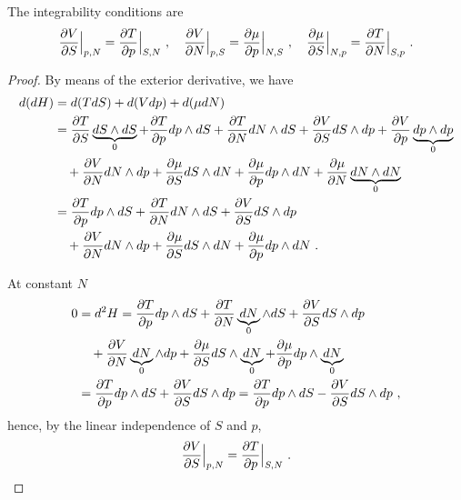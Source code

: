    The integrability conditions are 
    \begin{equation}\label{td:int:h}
        \frac{\partial V}{\partial S} \Big \vert_{p,N} = \frac{\partial T}{\partial p} \Big \vert_{S,N} ~, \quad 
        \frac{\partial V}{\partial N} \Big \vert_{p,S} = \frac{\partial\mu}{\partial p} \Big \vert_{N, S} ~, \quad 
        \frac{\partial\mu}{\partial S} \Big \vert_{N,p} = \frac{\partial T}{\partial N} \Big \vert_{S, p} ~. 
    \end{equation}
    \begin{proof}
        By means of the exterior derivative, we have 
        \begin{equation*}
        \begin{aligned}
            d (dH) & = d (T dS) + d (V dp) + d (\mu dN) \\ & = \frac{\partial T}{\partial S} \underbrace{dS \wedge dS}_0 + \frac{\partial T}{\partial p} dp \wedge dS + \frac{\partial T}{\partial N} dN \wedge dS + \frac{\partial V}{\partial S} dS \wedge dp + \frac{\partial V}{\partial p} \underbrace{dp \wedge dp}_0 \\ & \quad + \frac{\partial V}{\partial N} dN \wedge dp + \frac{\partial\mu}{\partial S} dS \wedge dN + \frac{\partial\mu}{\partial p} dp \wedge dN + \frac{\partial\mu}{\partial N} \underbrace{dN \wedge dN}_0 \\ & = \frac{\partial T}{\partial p} dp \wedge dS + \frac{\partial T}{\partial N} dN \wedge dS + \frac{\partial V}{\partial S} dS \wedge dp \\ & \quad + \frac{\partial V}{\partial N} dN \wedge dp + \frac{\partial\mu}{\partial S} dS \wedge dN + \frac{\partial\mu}{\partial p} dp \wedge dN  ~.
        \end{aligned}
        \end{equation*}

        At constant $N$ 
        \begin{equation*}
        \begin{aligned}
            0 & = d^2 H = \frac{\partial T}{\partial p} dp \wedge dS + \frac{\partial T}{\partial N} \underbrace{dN}_0 \wedge dS + \frac{\partial V}{\partial S} dS \wedge dp \\ & \quad + \frac{\partial V}{\partial N} \underbrace{dN}_0 \wedge dp + \frac{\partial\mu}{\partial S} dS \wedge \underbrace{dN}_0 + \frac{\partial\mu}{\partial p} dp \wedge \underbrace{dN}_0 \\ & = \frac{\partial T}{\partial p} dp \wedge dS + \frac{\partial V}{\partial S} dS \wedge dp = \frac{\partial T}{\partial p} dp \wedge dS - \frac{\partial V}{\partial S} dS \wedge dp ~,
        \end{aligned}
        \end{equation*}
        hence, by the linear independence of $S$ and $p$,
        \begin{equation*}
            \frac{\partial V}{\partial S} \Big \vert_{p,N} = \frac{\partial T}{\partial p} \Big \vert_{S,N} ~.
        \end{equation*}


\end{proof}
